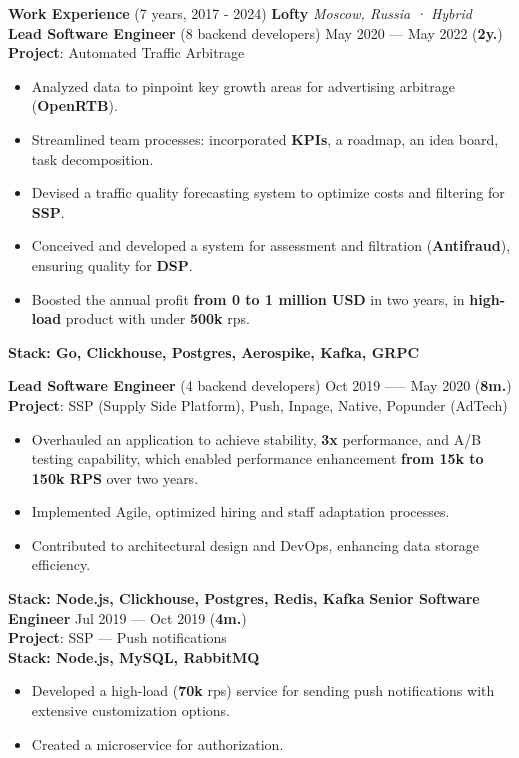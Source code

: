\documentclass{resume}
\begin{document}
\begin{rSection}{\textbf{Work Experience} (7 years, 2017 - 2024) }
    \textbf{Lofty} \hfill \textit{Moscow, Russia · Hybrid} \\
    \textbf{Lead Software Engineer} (8 backend developers) \hfill May 2020 --- May 2022 ({\textbf{2y.}}) \\
    \textbf{Project}: Automated Traffic Arbitrage
    \begin{itemize}
        \item Analyzed data to pinpoint key growth areas for advertising arbitrage (\textbf{OpenRTB})\@.
        \item Streamlined team processes: incorporated \textbf{KPIs}, a roadmap, an idea board, task decomposition\@.
        \item Devised a traffic quality forecasting system to optimize costs and filtering for \textbf{SSP}\@.
        \item Conceived and developed a system for assessment and filtration (\textbf{Antifraud}), ensuring quality for \textbf{DSP}\@.
        \item Boosted the annual profit \textbf{from 0 to 1 million USD} in two years, in \textbf{high-load} product with under \textbf{500k} rps\@.
    \end{itemize}
    \textbf{Stack: Go, Clickhouse, Postgres, Aerospike, Kafka, GRPC}


    \textbf{Lead Software Engineer} (4 backend developers) \hfill Oct 2019 —-- May 2020 ({\textbf{8m.}}) \\
    \textbf{Project}: SSP (Supply Side Platform), Push, Inpage, Native, Popunder (AdTech)
    \begin{itemize}
        \item Overhauled an application to achieve stability, \textbf{3x} performance, and A/B testing capability,
        which enabled performance enhancement \textbf{from 15k to 150k RPS} over two years\@.
        \item Implemented Agile, optimized hiring and staff adaptation processes\@.
        \item Contributed to architectural design and DevOps, enhancing data storage efficiency\@.
    \end{itemize}
    \textbf{Stack: Node.js, Clickhouse, Postgres, Redis, Kafka}
    \textbf{Senior Software Engineer} \hfill Jul 2019 --- Oct 2019 ({\textbf{4m.}}) \\
    \textbf{Project}: SSP --- Push notifications \\
    \textbf{Stack: Node.js, MySQL, RabbitMQ}
    \begin{itemize}
        \item Developed a high-load (\textbf{70k} rps) service for sending push notifications with extensive customization options\@.
        \item Created a microservice for authorization\@.
    \end{itemize}
    \clearpage


\end{rSection}
\end{document}
